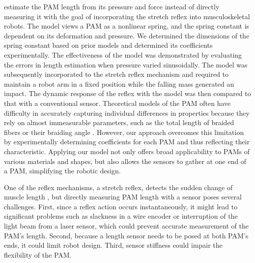 estimate the PAM length from its pressure and force instead of directly measuring it with the goal of incorporating the stretch reflex into musculoskeletal robots.
The model views a PAM as a nonlinear spring, and the spring constant is dependent on its deformation and pressure. 
We determined the dimensions of the spring constant based on prior models and determined its coefficients experimentally.
The effectiveness of the model was demonstrated by evaluating the errors in length estimation when pressure varied sinusoidally.
The model was subsequently incorporated to the stretch reflex mechanism and required to maintain a robot arm in a fixed position while the falling mass generated an impact.
The dynamic response of the reflex with the model was then compared to that with a conventional sensor. 
Theoretical models of the PAM often have difficulty in accurately capturing individual differences in properties because they rely on almost immeasurable parameters, such as the total length of braided fibers or their braiding angle \cite{motion}. However, our approach overcomes this limitation by experimentally determining coefficients for each PAM and thus reflecting their characteristic. Applying our model not only offers broad applicability to PAMs of various materials and shapes, but also allows the sensors to gather at one end of a PAM, simplifying the robotic design. 


One of the reflex mechanisms, a stretch reflex, detects the sudden change of muscle length \cite{kandel}, but directly measuring PAM length with a sensor poses several challenges\cite{nakajima}.
First, since a reflex action occurs instantaneously, it might lead to significant problems such as slackness in a wire encoder or interruption of the light beam from a laser sensor, 
which could prevent accurate measurement of the PAM's length. 
Second, because a length sensor needs to be posed at both PAM's ends, it could limit robot design. 
Third, sensor stiffness could impair the flexibility of the PAM.




